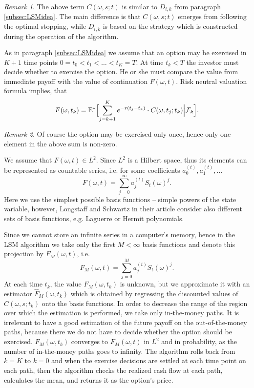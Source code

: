 \documentclass[a4paper,11pt, twoside]{book}
\theoremstyle{definition}
\theoremstyle{remark}
\newtheorem{remark}{Remark}[chapter]
\def\Em{{\mathbb{E}^*}}
\def\Bpipe{{\Bigl|\Bigr.}}
\begin{document}
\begin{remark}
 The above term $C(\omega, s; t)$ is similar to $D_{i,k}$ from paragraph \ref{subsec:LSMidea}. The main difference is that $C(\omega, s; t)$ emerges from following the optimal stopping, while $D_{i,k}$ is based on the strategy which is constructed during the operation of the algorithm.
\end{remark}
As in paragraph \ref{subsec:LSMidea} we assume that an option may be exercised in $K+1$ time points $0 = t_0 < t_1 < \ldots < t_K  = T$. At time $t_k < T$ the investor must decide whether to exercise the option. He or she must compare the value from immediate payoff with the value of continuation $F(\omega, t)$. Risk neutral valuation formula implies, that
\[ F(\omega, t_k) = \Em \Bigl[ \sum\limits_{j=k+1}^K e^{-r(t_j - t_k)}\cdot C(\omega, t_j; t_k) \Bpipe \mathcal{F}_k \Bigl]. \] 
\begin{remark}
 Of course the option may be exercised only once, hence only one element in the above sum is non-zero.
\end{remark}
We assume that $F(\omega, t) \in L^2$. Since $L^2$ is a Hilbert space, thus its elements can be represented as countable series, i.e. for some coefficients $a_0^{(t)},a_1^{(t)},\ldots$
\[ F(\omega, t) = \sum\limits_{j=0}^{\infty} a_j^{(t)} S_t(\omega)^j. \]
Here we use the simplest possible basis functions -- simple powers of the state variable, however, Longstaff and Schwartz in their article consider also different sets of basis functions, e.g. Laguerre or Hermit polynomials.

Since we cannot store an infinite series in a computer's memory, hence in the LSM algorithm we take only the first $M < \infty$ basis functions and denote this projection by $F_M(\omega, t)$, i.e.
\[ F_M(\omega, t) = \sum\limits_{j=0}^{M} a_j^{(t)} S_t(\omega)^j. \]
At each time $t_k$, the value $F_M(\omega, t_k)$ is unknown, but we approximate it with an estimator $\hat{F}_M(\omega, t_k)$ which is obtained by regressing the discounted values of $C(\omega, s; t_k)$ onto the basis functions.
In order to decrease the range of the region over which the estimation is performed, we take only in-the-money paths. It is irrelevant to have a good estimation of the future payoff on the out-of-the-money paths, because there we do not have to decide whether the option should be exercised. $\hat{F}_M(\omega, t_k)$ converges to $F_M(\omega, t)$ in $L^2$ and in probability, as the number of in-the-money paths goes to infinity.
The algorithm rolls back from $k=K$ to $k=0$ and when the exercise decisions are settled at each time point on each path, then the algorithm checks the realized cash flow at each path, calculates the mean, and returns it as the option's price.
\end{document}
